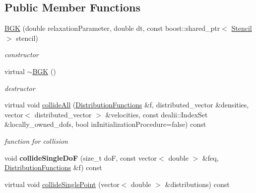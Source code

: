 \subsection*{Public Member Functions}
\begin{DoxyCompactItemize}
\item 
\hyperlink{classnatrium_1_1BGK_adf78ea65d5b96f55dc719b7ab7beb86d}{BGK} (double relaxationParameter, double dt, const boost::shared\_\-ptr$<$ \hyperlink{classnatrium_1_1Stencil}{Stencil} $>$ stencil)
\begin{DoxyCompactList}\small\item\em constructor \item\end{DoxyCompactList}\item 
\hypertarget{classnatrium_1_1BGK_a1029401a72788a6538e4e1941c305ab4}{
virtual \hyperlink{classnatrium_1_1BGK_a1029401a72788a6538e4e1941c305ab4}{$\sim$BGK} ()}
\label{classnatrium_1_1BGK_a1029401a72788a6538e4e1941c305ab4}

\begin{DoxyCompactList}\small\item\em destructor \item\end{DoxyCompactList}\item 
virtual void \hyperlink{classnatrium_1_1BGK_a9fa1c980217a183fc4762954e86ba36d}{collideAll} (\hyperlink{classnatrium_1_1DistributionFunctions}{DistributionFunctions} \&f, distributed\_\-vector \&densities, vector$<$ distributed\_\-vector $>$ \&velocities, const dealii::IndexSet \&locally\_\-owned\_\-dofs, bool inInitializationProcedure=false) const 
\begin{DoxyCompactList}\small\item\em function for collision \item\end{DoxyCompactList}\item 
\hypertarget{classnatrium_1_1BGK_ab82471c249d19fdc62005fb8b7e03190}{
void {\bfseries collideSingleDoF} (size\_\-t doF, const vector$<$ double $>$ \&feq, \hyperlink{classnatrium_1_1DistributionFunctions}{DistributionFunctions} \&f) const }
\label{classnatrium_1_1BGK_ab82471c249d19fdc62005fb8b7e03190}

\item 
\hypertarget{classnatrium_1_1BGK_aebf6d64d5e537c2e352451667d9003d4}{
virtual void \hyperlink{classnatrium_1_1BGK_aebf6d64d5e537c2e352451667d9003d4}{collideSinglePoint} (vector$<$ double $>$ \&distributions) const }
\label{classnatrium_1_1BGK_aebf6d64d5e537c2e352451667d9003d4}


\end{DoxyCompactItemize}
